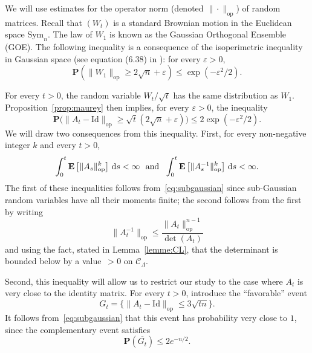 \documentclass[12pt]{amsart}
\newcommand{\E}{\mathbf{E}}
\newcommand{\e}{\varepsilon}
\renewcommand{\P}{\mathbf{P}}
\newcommand{\iy}{\infty}
\newcommand{\Id}{\mathrm{Id}}
\newcommand{\Sym}{\mathrm{Sym}}
\renewcommand{\leq}{\leqslant}
\renewcommand{\geq}{\geqslant}
\theoremstyle{plain}
\theoremstyle{remark}
\begin{document}
We will use estimates for the operator norm (denoted $\|\cdot\|_{\mathrm{op}}$) of random matrices. Recall that $(W_t)$ is a standard Brownian motion in the Euclidean space $\Sym_n$. The law of $W_1$ is known as the Gaussian Orthogonal Ensemble (GOE). The following inequality is a consequence of the isoperimetric inequality in Gaussian space (see equation (6.38) in \cite{AS17}): for every $\e>0$,
\[ \P( \|W_1\|_{\mathrm{op}} \geq 2 \sqrt{n} +\e ) \leq \exp(-\e^2/2). \]
 
For every $t>0$, the random variable $W_t/\sqrt{t}$ has the same distribution as $W_1$. Proposition~\ref{prop:maurey} then implies, for every $\e>0$, the inequality
\begin{equation} \label{eq:subgaussian} \P \bigl( \|A_t - \Id\|_{\mathrm{op}} \geq \sqrt{t} (2\sqrt{n}+\e) \bigr)\leq 2 \exp(-\e^2/2) .\end{equation}
We will draw two consequences from this inequality. First, for every non-negative integer $k$ and every $t>0$,
\begin{equation} \label{eq:finitemoments} \int_0^t \E \left[ \|A_s\|_{\mathrm{op}}^k \right] \, \mathrm{d}s < \iy \ \textnormal{ and } \ \int_0^t \E \left[ \|A_s^{-1}\|_{\mathrm{op}}^k \right] \, \mathrm{d}s< \iy .\end{equation}
The first of these inequalities follows from~\eqref{eq:subgaussian} since sub-Gaussian random variables have all their moments finite; the second follows from the first by writing
\[ \|A_t^{-1}\|_{\mathrm{op}} \leq \frac{\|A_t\|_{\mathrm{op}}^{n-1}}{\det (A_t)} \]
and using the fact, stated in Lemma~\ref{lemme:CL}, that the determinant is bounded below by a value~$>0$ on $\mathscr{C}_\Lambda$.
 
Second, this inequality will allow us to restrict our study to the case where $A_t$ is very close to the identity matrix. For every $t > 0$, introduce the ``favorable'' event
\[ G_t = \bigl\{ \|A_t - \Id \|_{\mathrm{op}}  \leq 3\sqrt{tn} \bigr\} .\]
It follows from~\eqref{eq:subgaussian} that this event has probability very close to $1$, since the complementary event satisfies
\[ \P (\overline{G_t}) \leq 2 e^{-n/2} .\]
 
\end{document}
